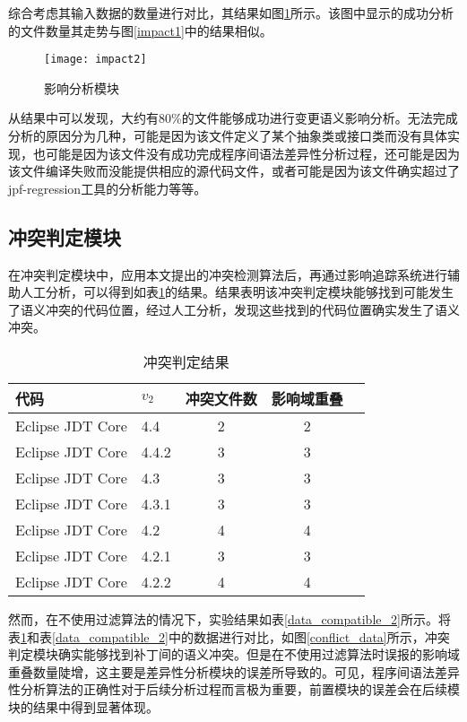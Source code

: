 综合考虑其输入数据的数量进行对比，其结果如图\ref {impact2}所示。该图中显示的成功分析的文件数量其走势与图\ref {impact1}中的结果相似。

\begin{figure}
	\centering
	\texttt{[image: impact2]}
	\caption {影响分析模块}
	\label {impact2}	
\end{figure}

从结果中可以发现，大约有80\%的文件能够成功进行变更语义影响分析。无法完成分析的原因分为几种，可能是因为该文件定义了某个抽象类或接口类而没有具体实现，也可能是因为该文件没有成功完成程序间语法差异性分析过程，还可能是因为该文件编译失败而没能提供相应的源代码文件，或者可能是因为该文件确实超过了jpf-regression工具的分析能力等等。

\subsection{冲突判定模块}

在冲突判定模块中，应用本文提出的冲突检测算法后，再通过影响追踪系统进行辅助人工分析，可以得到如表\ref {data_compatible}的结果。结果表明该冲突判定模块能够找到可能发生了语义冲突的代码位置，经过人工分析，发现这些找到的代码位置确实发生了语义冲突。

\begin{table}[H]
	\caption{冲突判定结果}
	\label{data_compatible}
	\centering
	\begin{tabular}{llccc}
		\toprule[1.5pt]
		{\heiti 代码} & {\heiti $v_2$} & {\heiti 冲突文件数} & {\heiti 影响域重叠}  \\\midrule[1pt]
		Eclipse JDT Core & 4.4 	& 2 & 2 \\
		Eclipse JDT Core & 4.4.2 & 3 & 3 \\
		Eclipse JDT Core & 4.3 	& 3 & 3 \\
		Eclipse JDT Core & 4.3.1 & 3 & 3 \\
		Eclipse JDT Core & 4.2 	& 4 & 4 \\
		Eclipse JDT Core & 4.2.1 & 3  &	3 \\
		Eclipse JDT Core & 4.2.2 & 4 & 4 \\
		\bottomrule[1.5pt]
	\end{tabular}
\end{table}

然而，在不使用过滤算法的情况下，实验结果如表\ref {data_compatible_2}所示。将表\ref {data_compatible}和表\ref {data_compatible_2}中的数据进行对比，如图\ref {conflict_data}所示，冲突判定模块确实能够找到补丁间的语义冲突。但是在不使用过滤算法时误报的影响域重叠数量陡增，这主要是差异性分析模块的误差所导致的。可见，程序间语法差异性分析算法的正确性对于后续分析过程而言极为重要，前置模块的误差会在后续模块的结果中得到显著体现。

